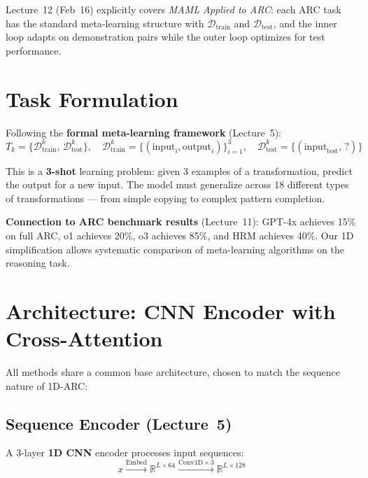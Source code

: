 \documentclass[11pt,a4paper]{article}
\begin{document}
Lecture~12 (Feb~16) explicitly covers \emph{MAML Applied to ARC}: each ARC task has the standard meta-learning structure with $\mathcal{D}_{\text{train}}$ and $\mathcal{D}_{\text{test}}$, and the inner loop adapts on demonstration pairs while the outer loop optimizes for test performance.

\section{Task Formulation}

Following the \textbf{formal meta-learning framework} (Lecture~5):
\begin{equation}
    T_k = \{\mathcal{D}_{\text{train}}^k, \, \mathcal{D}_{\text{test}}^k\}, \quad \mathcal{D}_{\text{train}}^k = \{(\text{input}_i, \text{output}_i)\}_{i=1}^{3}, \quad \mathcal{D}_{\text{test}}^k = \{(\text{input}_{\text{test}}, \, ?)\}
\end{equation}

This is a \textbf{3-shot} learning problem: given 3 examples of a transformation, predict the output for a new input. The model must generalize across 18 different types of transformations --- from simple copying to complex pattern completion.

\textbf{Connection to ARC benchmark results} (Lecture~11): GPT-4x achieves 15\% on full ARC, o1 achieves 20\%, o3 achieves 85\%, and HRM achieves 40\%. Our 1D simplification allows systematic comparison of meta-learning algorithms on the reasoning task.

\section{Architecture: CNN Encoder with Cross-Attention}

All methods share a common base architecture, chosen to match the sequence nature of 1D-ARC:

\subsection{Sequence Encoder (Lecture~5)}

A 3-layer \textbf{1D CNN} encoder processes input sequences:
\begin{equation}
    x \xrightarrow{\text{Embed}} \mathbb{R}^{L \times 64} \xrightarrow{\text{Conv1D} \times 3} \mathbb{R}^{L \times 128}
\end{equation}
\end{document}
